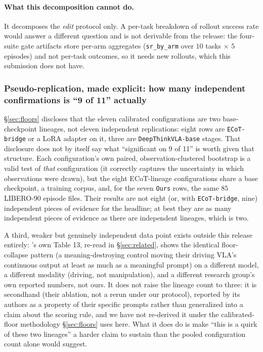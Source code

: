 \paragraph{What this decomposition cannot do.} It decomposes the \emph{edit} protocol only. A per-task breakdown of rollout success rate would answer a different question and is not derivable from the release: the four-suite gate artifacts store per-arm aggregates (\texttt{sr\_by\_arm} over $10$ tasks $\times$ $5$ episodes) and not per-task outcomes, so it needs new rollouts, which this submission does not have.

\subsubsection{Pseudo-replication, made explicit: how many independent confirmations is ``9 of 11'' actually}
\label{sec:pseudoreplication}

\S\ref{sec:floors} discloses that the eleven calibrated configurations are two base-checkpoint lineages, not eleven independent replications: eight rows are \texttt{ECoT-bridge} or a LoRA adapter on it, three are \texttt{DeepThinkVLA-base} stages. That disclosure does not by itself say what ``significant on 9 of 11'' is worth given that structure. Each configuration's own paired, observation-clustered bootstrap is a valid test of \emph{that} configuration (it correctly captures the uncertainty in which observations were drawn), but the eight ECoT-lineage configurations share a base checkpoint, a training corpus, and, for the seven \texttt{Ours} rows, the same $85$ LIBERO-90 episode files. Their results are not eight (or, with \texttt{ECoT-bridge}, nine) independent pieces of evidence for the headline; at best they are as many independent pieces of evidence as there are independent lineages, which is two.

A third, weaker but genuinely independent data point exists outside this release entirely: \citet{vladrivebench}'s own Table 13, re-read in \S\ref{sec:related}, shows the identical floor-collapse pattern (a meaning-destroying control moving their driving VLA's continuous output at least as much as a meaningful prompt) on a different model, a different modality (driving, not manipulation), and a different research group's own reported numbers, not ours. It does not raise the lineage count to three: it is secondhand (their ablation, not a rerun under our protocol), reported by its authors as a property of their specific prompts rather than generalized into a claim about the scoring rule, and we have not re-derived it under the calibrated-floor methodology \S\ref{sec:floors} uses here. What it does do is make ``this is a quirk of these two lineages'' a harder claim to sustain than the pooled configuration count alone would suggest.

